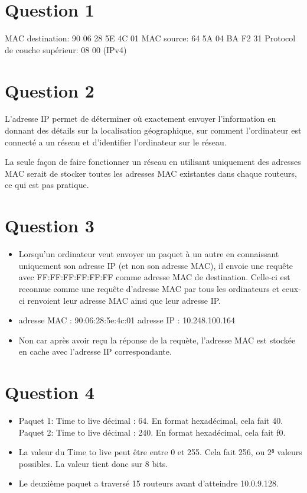 
\section{Question 1}
MAC destination: 90 06 28 5E 4C 01 
MAC source: 64 5A 04 BA F2 31
Protocol de couche supérieur: 08 00 (IPv4)
\section{Question 2}
L'adresse IP permet de déterminer où exactement envoyer l'information  en donnant des détails sur la localisation géographique, sur comment l'ordinateur est connecté a un réseau et d'identifier l'ordinateur sur le réseau.

La seule façon de faire fonctionner un réseau en
utilisant uniquement des adresses MAC serait de
stocker toutes les adresses MAC existantes dans
chaque routeurs, ce qui est pas pratique.

\section{Question 3}
\begin{itemize}
	\item Lorsqu'un ordinateur veut envoyer un paquet à un autre en connaissant uniquement son adresse IP (et non son adresse MAC), il envoie une requête avec FF:FF:FF:FF:FF:FF comme adresse MAC de destination. Celle-ci est reconnue comme une requête d'adresse MAC par tous les ordinateurs et ceux-ci renvoient leur adresse MAC ainsi que leur adresse IP.
	\item adresse MAC : 90:06:28:5e:4c:01
	adresse IP : 10.248.100.164
	\item Non car après avoir reçu la réponse de
	la requète, l'adresse MAC est stockée en cache
	 avec l'adresse IP correspondante.
\end{itemize}

\section{Question 4}
\begin{itemize}
	\item Paquet 1: Time to live décimal : 64. En format hexadécimal, cela fait 40. 
	Paquet 2: Time to live décimal : 240. En format hexadécimal, cela fait f0.
	\item La valeur du Time to live peut être entre 0 et 255. Cela fait 256, ou 2⁸ valeurs possibles. La valeur tient donc sur 8 bits.

	\item Le deuxième paquet a traversé 15 routeurs avant d'atteindre 10.0.9.128.
\end{itemize}
